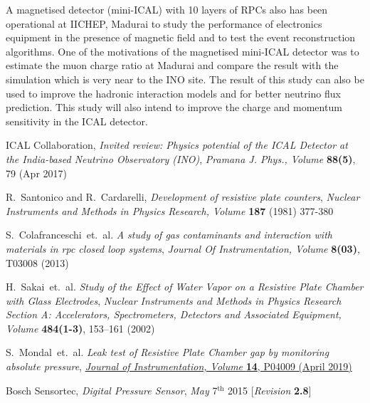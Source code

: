 \documentclass[a4paper,12pt,twoside,openany]{article}
\begin{document}
A magnetised detector (mini-ICAL) with 10 layers of RPCs also has been
operational at IICHEP, Madurai to study the performance of electronics
equipment in the presence of magnetic field and to test the event
reconstruction algorithms. One of the motivations of the magnetised
mini-ICAL detector was to estimate the muon charge ratio at Madurai
and compare the result with the simulation which is very near to the
INO site. The result of this study can also be used to improve the
hadronic interaction models and for better neutrino flux prediction.
This study will also intend to improve the charge and momentum
sensitivity in the ICAL detector.


\begin{thebibliography}{9}

  ICAL Collaboration,  \emph{Invited review: Physics potential of the ICAL Detector at the India-based Neutrino Observatory (INO)}, \emph{Pramana J. Phys., Volume } \textbf{88(5)}, 79 (Apr 2017)
  
  
  R.~Santonico and R.~Cardarelli, \emph{Development of resistive plate counters}, \emph{Nuclear Instruments and Methods in Physics Research, Volume} \textbf{187} (1981) 377-380

  S.~Colafranceschi~et.~al. \emph{A study of gas contaminants and interaction with materials in rpc closed loop systems}, \emph{Journal Of Instrumentation, Volume } \textbf{8(03)}, T03008 (2013)

  H.~Sakai~et.~al. \emph{Study of the Effect of Water Vapor on a Resistive Plate Chamber with Glass Electrodes}, \emph{Nuclear Instruments and Methods in Physics Research Section A: Accelerators, Spectrometers, Detectors and Associated Equipment, Volume } \textbf{484(1-3)}, 153--161 (2002)

  S.~Mondal~et.~al. \emph{Leak test of Resistive Plate Chamber gap by monitoring absolute pressure}, \href{https://doi.org/10.1088/1748-0221/14/04/P04009}{\emph{Journal of Instrumentation, Volume } \textbf{14}, P04009 (April 2019)}

  Bosch Sensortec, \emph{Digital Pressure Sensor}, \emph{May} 7$^\mathrm{th}$ 2015 [\emph{Revision} \textbf{2.8}]


\end{thebibliography}
\end{document}
